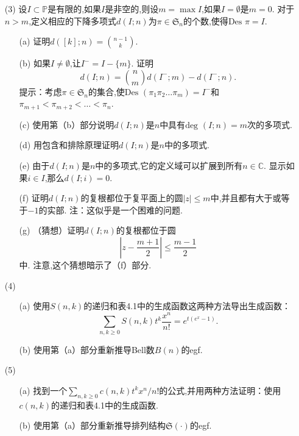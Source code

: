\documentclass[a4paper,12pt]{ctexbook}
\begin{document}
\begin{enumerate}
	\item[(3)] 设$I\subset\mathbb{P}$是有限的,如果$I$是非空的,则设$m=\max I$,如果$I=\emptyset$是$m=0$.  对于$n>m$,定义相应的下降多项式$d(I;n)$为$\pi\in\mathfrak{S}_n$的个数,使得$\text {Des }\pi=I$. 
	\begin{enumerate}
		\item[(a)] 证明$d([k];n)=\binom{n-1}{k}. $
		\item[(b)] 如果$I\ne\emptyset$,让$I^-=I-\{m\}$. 证明
		$$
		d(I;n)=\binom{n}{m}d(I^-;m)-d(I^-;n). 
		$$
		提示：考虑$\pi\in\mathfrak{S}_n$的集合,使$\text {Des }(\pi_1\pi_2\dots\pi_m)=I^-$和$\pi_{m+1}<\pi_{m+2}<\dots<\pi_{n}$. 
		\item[(c)] 使用第（b）部分说明$d(I;n)$是$n$中具有$\text {deg }(I;n)=m$次的多项式. 
		\item[(d)] 用包含和排除原理证明$d(I;n)$是$n$中的多项式. 
		\item[(e)] 由于$d(I;n)$是$n$中的多项式,它的定义域可以扩展到所有$n\in\mathbb{C}$. 显示如果$i\in I$,那么$d(I;i)=0$. 
		\item[(f)] 证明$d(I;n)$的复根都位于复平面上的圆$|z|\le m$中,并且都有大于或等于$-1$的实部. 注：这似乎是一个困难的问题. 
		\item[(g)] （猜想）证明$d(I;n)$的复根都位于圆
		$$
		\left|z-\frac{m+1}{2}\right|\le \frac{m-1}{2}
		$$
		中. 
		注意,这个猜想暗示了（f）部分.  
	\end{enumerate}
\end{enumerate}

\begin{enumerate}
	\item[(4)]
	\begin{enumerate}
		\item[(a)] 使用$S(n,k)$的递归和表4.1中的生成函数这两种方法导出生成函数：
		$$
		\sum_{n,k\geq0}S(n,k)t^k\frac{x^n}{n!}=e^{t(e^x-1)}. 
		$$
		\item[(b)] 使用第（a）部分重新推导Bell数$B(n)$的egf. 
	\end{enumerate}
\end{enumerate}

\begin{enumerate}
	\item[(5)]
	\begin{enumerate}
		\item[(a)] 找到一个$\sum_{n,k\geq0}c(n,k)t^kx^n/n!$的公式,并用两种方法证明：使用$c(n,k)$的递归和表4.1中的生成函数. 
		\item[(b)] 使用第（a）部分重新推导排列结构$\mathfrak{S}(\cdot)$的egf. 
	\end{enumerate}
\end{enumerate}
\end{document}

